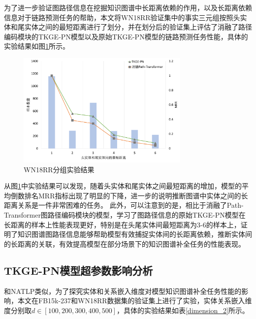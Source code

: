 为了进一步验证图路径信息在挖掘知识图谱中长距离依赖的作用，以及长距离依赖信息对于链路预测任务的帮助，本文将WN18RR验证集中的事实三元组按照头实体和尾实体之间的最短距离进行了划分，并在划分后的验证集上评估了消融了路径编码模块的TKGE-PN模型以及原始TKGE-PN模型的链路预测任务性能，具体的实验结果如图\ref{tkge_experiment}所示。

\begin{figure}[htbp]
    \centerline{\includegraphics[width=0.75\textwidth]{pic/TKGE-PN_experiment.pdf}}
    \caption{WN18RR分组实验结果}
    \label{tkge_experiment}
  \end{figure}

从图\ref{tkge_experiment}中实验结果可以发现，随着头实体和尾实体之间最短距离的增加，模型的平均倒数排名MRR指标出现了明显的下降，进一步的说明推断图谱中实体之间的长距离关系是一件非常困难的任务。 此外，可以注意到的是，相比于消融了Path-Transformer图路径编码模块的模型，学习了图路径信息的原始TKGE-PN模型在长距离的样本上性能表现更好，特别是在头尾实体间最短距离为3-6的样本上，证明了知识图谱图路径信息能够帮助模型有效捕捉实体间的长距离依赖，推断实体间的长距离的关联，有效提高模型在部分场景下的知识图谱补全任务的性能表现。

\subsection{TKGE-PN模型超参数影响分析}

和NATLP类似，为了探究实体和关系嵌入维度对模型知识图谱补全任务性能的影响，本文在FB15k-237和WN18RR数据集的验证集上进行了实验，实体关系嵌入维度分别取$d \in \left[100,200,300,400,500\right] $，具体的实验结果如表\ref{dimension_2}所示。

